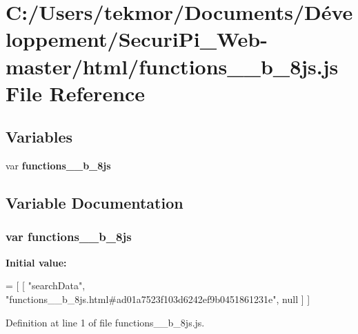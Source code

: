 \section{C\+:/\+Users/tekmor/\+Documents/\+Développement/\+Securi\+Pi\+\_\+\+Web-\/master/html/functions\+\_\+\+\_\+b\+\_\+8js.js File Reference}
\label{functions____b__8js_8js}
\subsection*{Variables}
\begin{DoxyCompactItemize}
\item 
var {\bf functions\+\_\+\+\_\+b\+\_\+8js}
\end{DoxyCompactItemize}


\subsection{Variable Documentation}
\subsubsection[{functions\+\_\+\+\_\+b\+\_\+8js}]{\setlength{\rightskip}{0pt plus 5cm}var functions\+\_\+\+\_\+b\+\_\+8js}\label{functions____b__8js_8js_a4ef8ad224ff63940f365a558abf604b6}
{\bfseries Initial value\+:}
\begin{DoxyCode}
=
[
    [ \textcolor{stringliteral}{"searchData"}, \textcolor{stringliteral}{"functions\_\_b\_8js.html#ad01a7523f103d6242ef9b0451861231e"}, null ]
]
\end{DoxyCode}


Definition at line 1 of file functions\+\_\+\+\_\+b\+\_\+8js.\+js.

